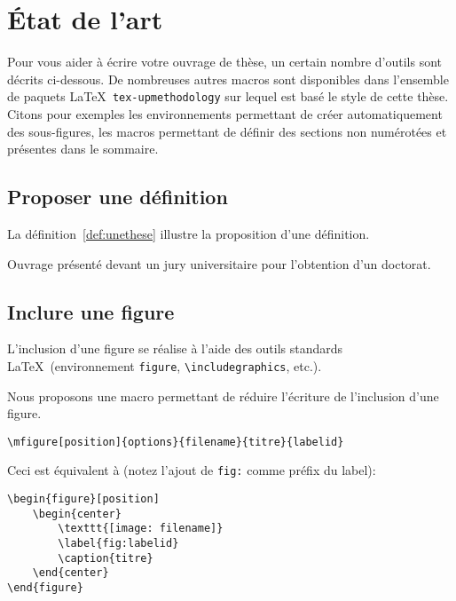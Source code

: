 \documentclass[french]{spimutbmphdthesis}
\begin{document}
\chapter{\'Etat de l'art}

%
\chapterintro

Pour vous aider à écrire votre ouvrage de thèse, un certain nombre d'outils sont décrits ci-dessous.
De nombreuses autres macros sont disponibles dans l'ensemble de paquets \LaTeX\ \texttt{tex-upmethodology}
sur lequel est basé le style de cette thèse. Citons pour exemples les environnements permettant de créer
automatiquement des sous-figures, les macros permettant de définir des sections non numérotées et présentes
dans le sommaire.

\section{Proposer une définition}

La définition~\ref{def:unethese} illustre la proposition d'une définition.

\begin{definition} \label{def:unethese}
Ouvrage présenté devant un jury universitaire pour l'obtention d'un doctorat.
\end{definition}

\section{Inclure une figure}

L'inclusion d'une figure se réalise à l'aide des outils standards \LaTeX\ (environnement \texttt{figure}, \texttt{{\textbackslash}includegraphics}, etc.).

Nous proposons une macro permettant de réduire l'écriture de l'inclusion d'une figure.

\begin{verbatim}
\mfigure[position]{options}{filename}{titre}{labelid}
\end{verbatim}

Ceci est équivalent à (notez l'ajout de \texttt{fig:} comme préfix du label):
\begin{verbatim}
\begin{figure}[position]
	\begin{center}
		\texttt{[image: filename]}
		\label{fig:labelid}
		\caption{titre}
	\end{center}
\end{figure}
\end{verbatim}
\end{document}
